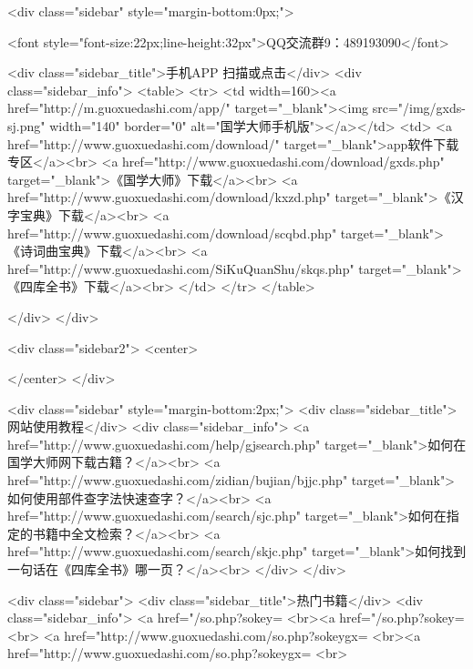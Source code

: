 <div class="sidebar" style="margin-bottom:0px;">

<font style="font-size:22px;line-height:32px">QQ交流群9：489193090</font>


<div class="sidebar_title">手机APP 扫描或点击</div>
<div class="sidebar_info">
<table>
<tr>
	<td width=160><a href="http://m.guoxuedashi.com/app/" target="_blank"><img src="/img/gxds-sj.png" width="140"  border="0" alt="国学大师手机版"></a></td>
	<td>
<a href="http://www.guoxuedashi.com/download/" target="_blank">app软件下载专区</a><br>
<a href="http://www.guoxuedashi.com/download/gxds.php" target="_blank">《国学大师》下载</a><br>
<a href="http://www.guoxuedashi.com/download/kxzd.php" target="_blank">《汉字宝典》下载</a><br>
<a href="http://www.guoxuedashi.com/download/scqbd.php" target="_blank">《诗词曲宝典》下载</a><br>
<a href="http://www.guoxuedashi.com/SiKuQuanShu/skqs.php" target="_blank">《四库全书》下载</a><br>
</td>
</tr>
</table>

</div>
</div>


<div class="sidebar2">
<center>


</center>
</div>

<div class="sidebar"  style="margin-bottom:2px;">
<div class="sidebar_title">网站使用教程</div>
<div class="sidebar_info">
<a href="http://www.guoxuedashi.com/help/gjsearch.php" target="_blank">如何在国学大师网下载古籍？</a><br>
<a href="http://www.guoxuedashi.com/zidian/bujian/bjjc.php" target="_blank">如何使用部件查字法快速查字？</a><br>
<a href="http://www.guoxuedashi.com/search/sjc.php" target="_blank">如何在指定的书籍中全文检索？</a><br>
<a href="http://www.guoxuedashi.com/search/skjc.php" target="_blank">如何找到一句话在《四库全书》哪一页？</a><br>
</div>
</div>


<div class="sidebar">
<div class="sidebar_title">热门书籍</div>
<div class="sidebar_info">
<a href="/so.php?sokey=%
<br><a href="/so.php?sokey=%
<br>
<a href="http://www.guoxuedashi.com/so.php?sokeygx=%
<br><a href="http://www.guoxuedashi.com/so.php?sokeygx=%
<br>

